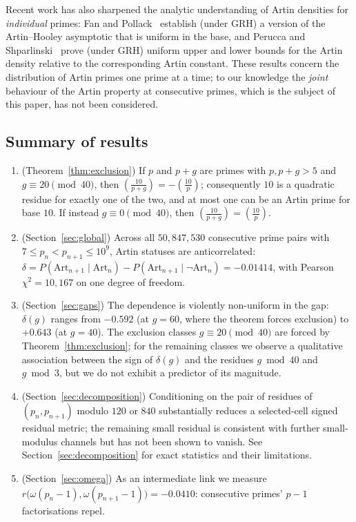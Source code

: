 \documentclass[11pt]{amsart}
\theoremstyle{definition}
\newcommand{\Lsym}[2]{\left(\tfrac{#1}{#2}\right)}
\newcommand{\Art}{\mathrm{Art}}
\begin{document}
Recent work has also sharpened the analytic understanding of Artin densities
for \emph{individual} primes: Fan and Pollack~\cite{FanPollack2025} establish
(under GRH) a version of the Artin--Hooley asymptotic that is uniform in the
base, and Perucca and Shparlinski~\cite{PeruccaShparlinski2025} prove (under GRH) uniform
upper and lower bounds for the Artin density relative to the corresponding
Artin constant. These results concern the distribution of Artin primes one
prime at a time; to our knowledge the \emph{joint} behaviour of the Artin
property at consecutive primes, which is the subject of this paper, has not
been considered.

\subsection*{Summary of results}
\begin{enumerate}
	\item (Theorem~\ref{thm:exclusion}) If $p$ and $p + g$ are primes with
	      $p, p + g > 5$ and $g \equiv 20 \pmod{40}$, then $\Lsym{10}{p+g} = -\Lsym{10}{p}$;
	      consequently $10$ is a quadratic residue for exactly one of the two, and at
	      most one can be an Artin prime for base $10$. If instead
	      $g \equiv 0 \pmod{40}$, then $\Lsym{10}{p+g} = \Lsym{10}{p}$.
	\item (Section~\ref{sec:global}) Across all $50{,}847{,}530$ consecutive
	      prime pairs with $7 \le p_n < p_{n+1} \le 10^9$, Artin statuses are
	      anticorrelated:
	      $\delta = P(\Art_{n+1} \mid \Art_n) - P(\Art_{n+1} \mid \lnot \Art_n)
		      = -0.01414$, with Pearson $\chi^2 = 10{,}167$ on one degree of freedom.
	\item (Section~\ref{sec:gaps}) The dependence is violently non-uniform in
	      the gap: $\delta(g)$ ranges from $-0.592$ (at $g = 60$, where the theorem
	      forces exclusion) to $+0.643$ (at $g = 40$). The exclusion classes
	      $g \equiv 20 \pmod{40}$ are forced by Theorem~\ref{thm:exclusion}; for
	      the remaining classes we observe a qualitative association between the
	      sign of $\delta(g)$ and the residues $g \bmod 40$ and $g \bmod 3$, but
	      we do not exhibit a predictor of its magnitude.
	\item (Section~\ref{sec:decomposition}) Conditioning on the pair of residues
	      of $(p_n, p_{n+1})$ modulo $120$ or $840$ substantially reduces a
	      selected-cell signed residual metric; the remaining small residual
	      is consistent with further small-modulus channels but has not been shown to
	      vanish. See Section~\ref{sec:decomposition} for exact statistics and
	      their limitations.
	\item (Section~\ref{sec:omega}) As an intermediate link
	      we measure $r\bigl(\omega(p_n-1), \omega(p_{n+1}-1)\bigr) = -0.0410$:
	      consecutive primes' $p-1$ factorisations repel.
\end{enumerate}
\end{document}
